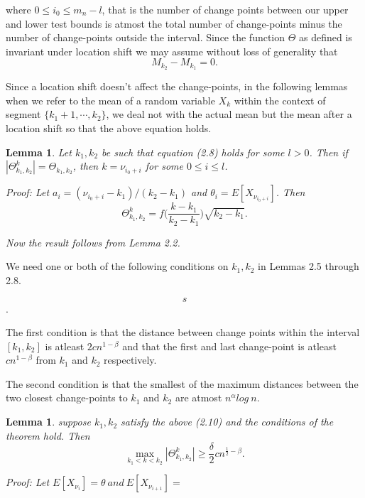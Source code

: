 \documentclass[a4paper, 12pt, notitlepage]{report}
\newtheorem{lemma}[theorem]{Lemma}
\begin{document}
where \(0 \leq i_0 \leq m_n - l\), that is the number of change points between our upper and lower test bounds is atmost the total number of change-points minus the number of change-points outside the interval. Since the function \(\Theta\) as defined %
is invariant under location shift we may assume without loss of generality that
\[M_{k_2} - M_{k_1} = 0.\]

Since a location shift doesn't affect the change-points, in the following lemmas when we refer to the mean of a random variable \(X_k\) within the context of segment \( \{ k_1 +1, \cdots, k_2 \} \), we deal not with the actual mean but the mean after a location shift so that the above equation holds.

\begin{lemma}
%
Let \( k_1, k_2 \) be such that equation (2.8) holds for some \(l > 0\). Then if \(|\Theta^k_{k_1,k_2}| = \Theta_{k_1,k_2}\), then \( k = \nu_{i_0+i}\) for some \(0 \leq i \leq l\).

Proof:\newline
Let \(a_i = (\nu_{i_0+i} - k_1)/(k_2 - k_1)\) and \(\theta_i = E[X_{\nu_{i_0+i}}]\). Then
\[ \Theta^k_{k_1,k_2} = f \Bigg(\frac{k - k_1}{k_2 - k_1}\Bigg ) \sqrt{k_2 - k_1}.\]

Now the result follows from Lemma 2.2.
\end{lemma}
%


We need one or both of the following conditions on \(k_1, k_2\) in Lemmas 2.5 through 2.8.

\[s\].

The first condition is that the distance between change points within the interval \( [k_1, k_2]\) is atleast \(2cn^{1-\beta}\) and that the first and last change-point is atleast \(cn^{1-\beta} \) from \( k_1 \) and \( k_2 \) respectively.

The second condition is that the smallest of the maximum distances between the two closest change-points to \(k_1\) and \(k_2\) are atmost \(n^\alpha log \ n\).

\begin{lemma}
%
suppose \(k_1, k_2\) satisfy the above (2.10) and the conditions of the theorem hold.
Then
\[\max_{k_1<k<k_2}|\Theta^k_{k_1,k_2}| \geq \frac{\delta}{2}cn^{\frac{1}{2} - \beta}.\]

Proof: \newline
Let \(E[X_{\nu_i}] = \theta \ and \ E[X_{\nu_{i + 1}}] =\)%

\end{lemma}
\end{document}
